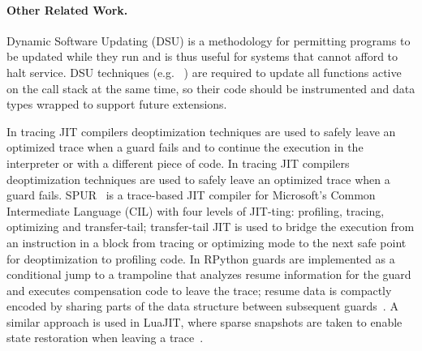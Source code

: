 \paragraph{Other Related Work.}
\ifdefined \fullver
Dynamic Software Updating (DSU) is a methodology for permitting programs to be updated while they run and is thus useful for systems that cannot afford to halt service. DSU techniques (e.g. ~\cite{neamtiu2006dsu,makris2009dsu}) are required to update all functions active on the call stack at the same time, so their code should be instrumented and data types wrapped to support future extensions.

In tracing JIT compilers deoptimization techniques are used to safely leave an optimized trace when a guard fails and to continue the execution in the interpreter or with a different piece of code.
\fi
In tracing JIT compilers deoptimization techniques are used to safely leave an optimized trace when a guard fails. SPUR~\cite{bebenita2010spur} is a trace-based JIT compiler for Microsoft's Common Intermediate Language (CIL) with four levels of JIT-ting: profiling, tracing, optimizing and transfer-tail; transfer-tail JIT is used to bridge the execution from an instruction in a block from tracing or optimizing mode to the next safe point for deoptimization to profiling code. In RPython guards are implemented as a conditional jump to a trampoline that analyzes resume information for the guard and executes compensation code to leave the trace; resume data is compactly encoded by sharing parts of the data structure between subsequent guards~\cite{schneider2012rpython}. A similar approach is used in LuaJIT, where sparse snapshots are taken to enable state restoration when leaving a trace~\cite{luajit}.


